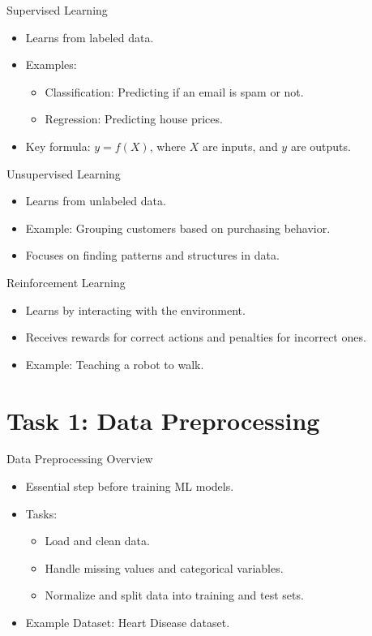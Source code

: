 \documentclass{beamer}
\begin{document}
\begin{frame}{Supervised Learning}
\begin{itemize}
    \item Learns from labeled data.
    \item Examples:
    \begin{itemize}
        \item Classification: Predicting if an email is spam or not.
        \item Regression: Predicting house prices.
    \end{itemize}
    \item Key formula: $y = f(X)$, where $X$ are inputs, and $y$ are outputs.
\end{itemize}
\end{frame}

\begin{frame}{Unsupervised Learning}
\begin{itemize}
    \item Learns from unlabeled data.
    \item Example: Grouping customers based on purchasing behavior.
    \item Focuses on finding patterns and structures in data.
\end{itemize}
\end{frame}

\begin{frame}{Reinforcement Learning}
\begin{itemize}
    \item Learns by interacting with the environment.
    \item Receives rewards for correct actions and penalties for incorrect ones.
    \item Example: Teaching a robot to walk.
\end{itemize}
\end{frame}

\section{Task 1: Data Preprocessing}

\begin{frame}{Data Preprocessing Overview}
\begin{itemize}
    \item Essential step before training ML models.
    \item Tasks:
    \begin{itemize}
        \item Load and clean data.
        \item Handle missing values and categorical variables.
        \item Normalize and split data into training and test sets.
    \end{itemize}
    \item Example Dataset: Heart Disease dataset.
\end{itemize}
\end{frame}
\end{document}
